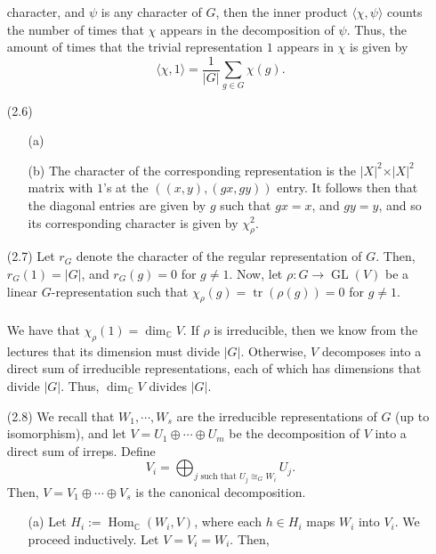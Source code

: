 \documentclass[a4paper]{report}
\theoremstyle{definition}
\theoremstyle{remark}
\theoremstyle{proposition}
\theoremstyle{conjecture}
\theoremstyle{lemma}
\theoremstyle{corollary}
\theoremstyle{exercise}
\theoremstyle{example}
\newcommand{\C}{\mathbb{C}}
\newcommand{\on}{\operatorname}
\begin{document}
\begin{enumerate}
        character, and $\psi$ is any character of $G$, then the inner product
        $\langle \chi,\psi\rangle$ counts the number of times that $\chi$
        appears in the decomposition of $\psi$.
        Thus, the amount of times that the trivial representation $1$ 
        appears in $\chi$ is given by
        $$\langle \chi,1\rangle = \frac{1}{\vert G\vert}\sum_{g\in G}\chi(g).$$
    \item[(2.6)]
        \begin{itemize}
            \item[(a)] 
            \item[(b)] The character of the corresponding representation
                is the $\vert X\vert^2 \times \vert X\vert^2$ matrix
                with $1$'s at the $((x,y), (gx,gy))$ entry.
                It follows then that the diagonal entries are given by 
                $g$ such that $gx=x$, and $gy=y$, and so 
                its corresponding character is given by $\chi_\rho^2$.
        \end{itemize}
    \item[(2.7)] Let $r_G$ denote the character of the regular 
        representation of $G$. Then, $r_G(1) = \vert G\vert$, and 
        $r_G(g) = 0$ for $g\neq 1$.
        Now, let $\rho : G \to \on{GL}(V)$ be a linear $G$-representation such 
        that $\chi_\rho(g) = \on{tr}(\rho(g)) = 0$ for $g\neq 1$.\\\\
        We have that $\chi_\rho(1) = \dim_\C V$. If $\rho$ is irreducible,
        then we know from the lectures that its dimension must divide 
        $\vert G\vert$. Otherwise, $V$ decomposes into a direct sum of 
        irreducible representations, each of which has dimensions that 
        divide $\vert G\vert$. Thus, $\dim_\C V$ divides $\vert G\vert$.
    \item[(2.8)] We recall that $W_1,\cdots,W_s$ are the irreducible
        representations of $G$ (up to isomorphism), and let 
        $V = U_1\oplus \cdots \oplus U_m$ be the decomposition of $V$
        into a direct sum of irreps. 
        Define $$V_i = \bigoplus_{\text{$j$ such that $U_j\cong_G W_i$}}U_j.$$
        Then, $V = V_1 \oplus \cdots \oplus V_s$ is the canonical decomposition.
        \begin{itemize}
            \item[(a)] Let $H_i := \on{Hom}_\C(W_i,V)$, where 
                each $h \in H_i$ maps $W_i$ into $V_i$.
                We proceed inductively. 
                Let $V = V_i =  W_i$. Then, 

\end{itemize}
\end{enumerate}
\end{document}
